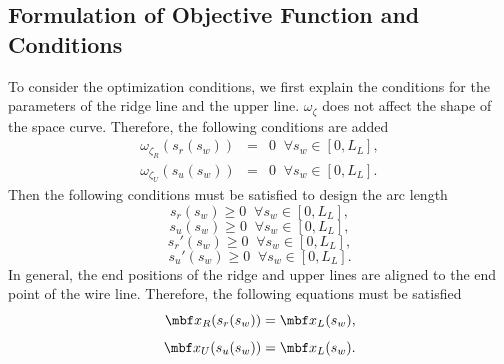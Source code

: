 \documentclass[E]{scitrans}
\begin{document}
\subsection*{Formulation of Objective Function and Conditions}
To consider the optimization conditions, we first explain the conditions for the parameters of the ridge line and the upper line. $ \omega_{\zeta} $ does not affect the shape of the space curve. Therefore, the following conditions are added 
\begin{eqnarray}\label{eq:conds_omgZt}
\omega_{\zeta_R}(s_r(s_w)) &=& 0 \;\; \forall s_w\in[0,L_L], \\
\omega_{\zeta_U}(s_u(s_w)) &=& 0 \;\; \forall s_w\in[0,L_L]. 
\end{eqnarray}
Then the following conditions must be satisfied to design the arc length
\begin{equation}\label{eq:conds_arc1}
	s_r(s_w) \geq 0 \;\; \forall s_w\in[0,L_L], 
\end{equation}
\begin{equation}\label{eq:conds_arc2}
	s_u(s_w) \geq 0 \;\; \forall s_w\in[0,L_L], 
\end{equation}
\begin{equation}\label{eq:conds_arc3}
	s_r'(s_w) \geq 0 \;\; \forall s_w\in[0,L_L], 
\end{equation}
\begin{equation}\label{eq:conds_arc4}
	s_u'(s_w) \geq 0 \;\; \forall s_w\in[0,L_L].
\end{equation}
In general, the end positions of the ridge and upper lines are aligned to the end point of the wire line. Therefore, the following equations must be satisfied 
\begin{equation}\label{eq:conds_endp1}
	\mbold{x}_R (s_r(s_w)) = \mbold{x}_L(s_w), 
\end{equation}
\begin{equation}\label{eq:conds_endp2}
	\mbold{x}_U (s_u(s_w)) = \mbold{x}_L(s_w).
\end{equation}
\end{document}
